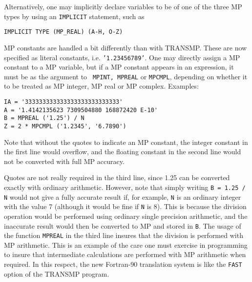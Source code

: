 \noindent
Alternatively, one may implicitly declare variables to be of one of
the three MP types by using an {\tt IMPLICIT} statement, such as

\begin{tt} \begin{small} \begin{verbatim}
IMPLICIT TYPE (MP_REAL) (A-H, O-Z)
\end{verbatim} \end{small} \end{tt}

MP constants are handled a bit differently than with TRANSMP.  These
are now specified as literal constants, i.e. {\tt '1.23456789'}.  One
may directly assign a MP constant to a MP variable, but if a MP
constant appears in an expression, it must be as the argument to {\tt
MPINT, MPREAL} or {\tt MPCMPL}, depending on whether it to be treated
as MP integer, MP real or MP complex.  Examples:

\begin{tt} \begin{small} \begin{verbatim}
IA = '333333333333333333333333333'
A = '1.4142135623 7309504880 168872420 E-10'
B = MPREAL ('1.25') / N
Z = 2 * MPCMPL ('1.2345', '6.7890')
\end{verbatim} \end{small} \end{tt}

\noindent
Note that without the quotes to indicate an MP constant, the integer
constant in the first line would overflow, and the floating constant
in the second line would not be converted with full MP accuracy.  

Quotes are not really required in the third line, since 1.25 can be
converted exactly with ordinary arithmetic.  However, note that simply
writing {\tt B = 1.25 / N} would not give a fully accurate result if,
for example, {\tt N} is an ordinary integer with the value 7 (although
it would be fine if {\tt N} is 8).  This is because the division
operation would be performed using ordinary single precision
arithmetic, and the inaccurate result would then be converted to MP
and stored in {\tt B}.  The usage of the function {\tt MPREAL} in the
third line insures that the division is performed with MP arithmetic.
This is an example of the care one must exercise in programming to
insure that intermediate calculations are performed with MP arithmetic
when required.  In this respect, the new Fortran-90 translation system
is like the {\tt FAST} option of the TRANSMP program.

